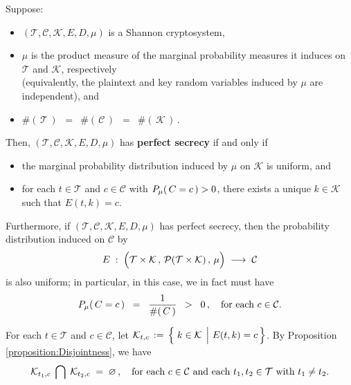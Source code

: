 \clearpage
\begin{theorem}[Shannon]
\mbox{}
\vskip 0.1cm
\noindent
Suppose:
\begin{itemize}
\item
	$(\mathcal{T},\mathcal{C},\mathcal{K},E,D,\mu)$
	is a Shannon cryptosystem,
\item
	$\mu$ is the product measure of the marginal probability measures it induces
	on $\mathcal{T}$ and $\mathcal{K}$, respectively\\
	(equivalently, the plaintext and key random variables induced by $\mu$ are independent), and
\item
	$\#\!\left(\,\mathcal{T}\,\right)$
	\,$=$\,
	$\#\!\left(\,\mathcal{C}\,\right)$
	\,$=$\,
	$\#\!\left(\,\mathcal{K}\,\right)$\,.
\end{itemize}
Then, $(\mathcal{T},\mathcal{C},\mathcal{K},E,D,\mu)$
has \textbf{perfect secrecy} if and only if
\begin{itemize}
\item
	the marginal probability distribution induced by $\mu$ on $\mathcal{K}$ is uniform, and
\item
	for each $t \in \mathcal{T}$ and $c \in \mathcal{C}$
	with $P_{\mu}\!\left(\,C \overset{{\color{white}.}}{=} c\,\right) > 0$,
	there exists a unique $k \in \mathcal{K}$
	such that $E(t,k) = c$.
\end{itemize}
Furthermore, if $(\mathcal{T},\mathcal{C},\mathcal{K},E,D,\mu)$
has perfect secrecy, then the probability distribution induced on $\mathcal{C}$ by
\begin{equation*}
E
\; : \;
	\left(
		\mathcal{T}\overset{{\color{white}.}}{\times}\mathcal{K}
		\,,\,\mathcal{P}(\mathcal{T}\times\mathcal{K})
		\,,\,\mu
	\right)
\;\longrightarrow\;
	\mathcal{C}
\end{equation*}
is also uniform; in particular, in this case, we in fact must have
\begin{equation*}
P_{\mu}\!\left(\,C \overset{{\color{white}.}}{=} c\,\right)
\;\; = \;\;
	\dfrac{1}{\#\!\left(\,C\,\right)}
\;\; > \;\;
	0\,,
\quad
\textnormal{for each $c \in \mathcal{C}$}.
\end{equation*}
\end{theorem}

\proof
For each $t \in \mathcal{T}$ and $c \in \mathcal{C}$, let
$\mathcal{K}_{t,c} \,:=\, \left\{\,\left. k \overset{{\color{white}.}}{\in} \mathcal{K} \;\,\right\vert\, E(t,k) = c\,\right\}$.
By Proposition \ref{proposition:Disjointness}, we have
\begin{equation*}
\mathcal{K}_{t_{1},c} \;\bigcap\; \mathcal{K}_{t_{2},c} \; = \; \varnothing\,,
\quad
\textnormal{for each $c \in \mathcal{C}$ and each $t_{1}, t_{2} \in \mathcal{T}$ with $t_{1} \neq t_{2}$}.
\end{equation*}

